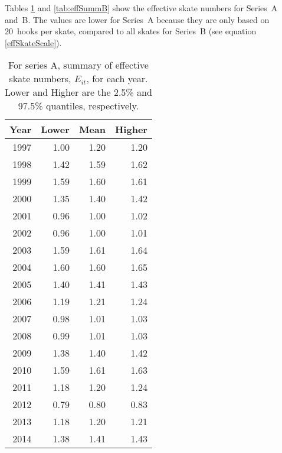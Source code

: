 Tables \ref{tab:effSummA} and \ref{tab:effSummB} show the effective skate
numbers for Series~A and~B. The values are lower for Series~A because they are
only based on 20~hooks per skate, compared to all skates for Series~B (see
equation \ref{effSkateScale}). 
%
\begin{table}[p]
\centering
\caption{For series A, summary of effective skate numbers, 
     $E_{it}$, for each
     year. Lower and Higher are the 2.5\% and 97.5\% quantiles, 
     respectively.} 
\label{tab:effSummA}
\begin{tabular}{rrrr}
  \hline
Year & Lower & Mean & Higher \\ 
  \hline
1997 & 1.00 & 1.20 & 1.20 \\ 
  1998 & 1.42 & 1.59 & 1.62 \\ 
  1999 & 1.59 & 1.60 & 1.61 \\ 
  2000 & 1.35 & 1.40 & 1.42 \\ 
  2001 & 0.96 & 1.00 & 1.02 \\ 
  2002 & 0.96 & 1.00 & 1.01 \\ 
  2003 & 1.59 & 1.61 & 1.64 \\ 
  2004 & 1.60 & 1.60 & 1.65 \\ 
  2005 & 1.40 & 1.41 & 1.43 \\ 
  2006 & 1.19 & 1.21 & 1.24 \\ 
  2007 & 0.98 & 1.01 & 1.03 \\ 
  2008 & 0.99 & 1.01 & 1.03 \\ 
  2009 & 1.38 & 1.40 & 1.42 \\ 
  2010 & 1.59 & 1.61 & 1.63 \\ 
  2011 & 1.18 & 1.20 & 1.24 \\ 
  2012 & 0.79 & 0.80 & 0.83 \\ 
  2013 & 1.18 & 1.20 & 1.21 \\ 
  2014 & 1.38 & 1.41 & 1.43 \\ 
   \hline
\end{tabular}
\end{table}
